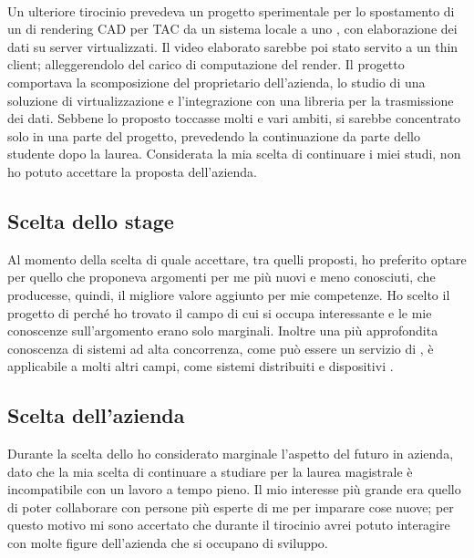    \paragraph*{}
   Un ulteriore tirocinio prevedeva un progetto sperimentale per lo spostamento di un  di rendering \gls{CAD} per \gls{TAC} da un sistema locale a uno , con elaborazione dei dati su server virtualizzati. Il video elaborato sarebbe poi stato servito a un \gls{thin client}; alleggerendolo del carico di computazione del render. Il progetto comportava la scomposizione del  proprietario dell'azienda, lo studio di una soluzione di virtualizzazione e l'integrazione con una libreria per la trasmissione dei dati. Sebbene lo  proposto toccasse molti e vari ambiti, si sarebbe concentrato solo in una parte del progetto, prevedendo la continuazione da parte dello studente dopo la laurea. Considerata la mia scelta di continuare i miei studi, non ho potuto accettare la proposta dell'azienda.

   \subsection{Scelta dello stage}
   Al momento della scelta di quale  accettare, tra quelli proposti, ho preferito optare per quello che proponeva argomenti per me più nuovi e meno conosciuti, che producesse, quindi, il migliore valore aggiunto per mie competenze.
   Ho scelto il progetto di \nomeAzienda{} perché ho trovato il campo di cui si occupa interessante e le mie conoscenze sull'argomento erano solo marginali. Inoltre una più approfondita conoscenza di sistemi ad alta concorrenza, come può essere un servizio di , è applicabile a molti altri campi, come sistemi  distribuiti e dispositivi .

   \subsection{Scelta dell'azienda}
   Durante la scelta dello  ho considerato marginale l'aspetto del futuro in azienda, dato che la mia scelta di continuare a studiare per la laurea magistrale è incompatibile con un lavoro a tempo pieno. Il mio interesse più grande era quello di poter collaborare con persone più esperte di me per imparare cose nuove; per questo motivo mi sono accertato che durante il tirocinio avrei potuto interagire con molte figure dell'azienda che si occupano di sviluppo.
